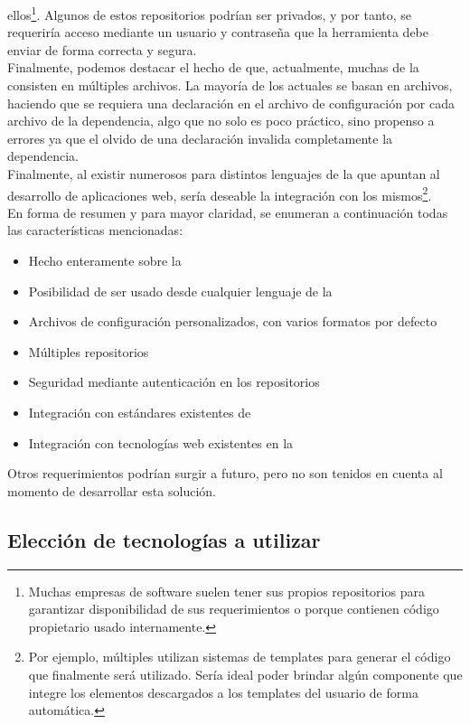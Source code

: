 ellos\footnote{
	Muchas empresas de software suelen tener sus propios repositorios para
	garantizar disponibilidad de sus requerimientos o porque contienen código
	propietario usado internamente.
}. Algunos de estos repositorios podrían ser privados, y por tanto, se requeriría
acceso mediante un usuario y contraseña que la herramienta debe enviar de forma
correcta y segura.\\
Finalmente, podemos destacar el hecho de que, actualmente, muchas \dependencies
de la \viewtier consisten en múltiples archivos. La mayoría de los \depmgrs actuales
se basan en archivos, haciendo que se requiera una declaración en el archivo de
configuración por cada archivo de la dependencia, algo que no solo es poco práctico,
sino propenso a errores ya que el olvido de una declaración invalida completamente
la dependencia.\\
Finalmente, al existir numerosos \frameworks para distintos lenguajes de la \jvm
que apuntan al desarrollo de aplicaciones web, sería deseable la integración con los
mismos\footnote{
	Por ejemplo, múltiples \frameworks utilizan sistemas de templates para generar el
	código \html que finalmente será utilizado. Sería ideal poder brindar algún
	componente que integre los elementos descargados a los templates del usuario
	de forma automática.
}.\\
En forma de resumen y para mayor claridad, se enumeran a continuación todas las
características mencionadas:
\begin{itemize}
	\setlength{\itemsep}{1pt}
	\setlength{\parskip}{0pt}
	\setlength{\parsep}{0pt}
	\item Hecho enteramente sobre la \jvm
	\item Posibilidad de ser usado desde cualquier lenguaje de la \jvm
	\item Archivos de configuración personalizados, con varios formatos por defecto
	\item Múltiples repositorios
	\item Seguridad mediante autenticación en los repositorios
	\item Integración con estándares existentes de \depmgrs
	\item Integración con tecnologías web existentes en la \jvm
\end{itemize}
Otros requerimientos podrían surgir a futuro, pero no son tenidos en cuenta al
momento de desarrollar esta solución.



\subsection{Elección de tecnologías a utilizar}
\label{subsec:solution:technology}

